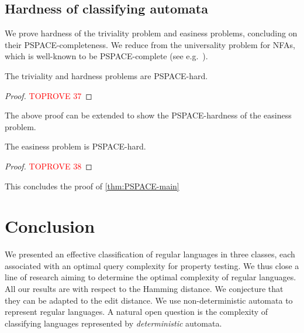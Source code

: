 \documentclass[letterpaper, USenglish, cleveref, autoref, thm-restate, numberwithinsect]{lipics-v2021}
\theoremstyle{theorem}
\theoremstyle{definition}
\newcommand{\PSPACE}{\textsf{PSPACE}\xspace}
\begin{document}
\subsection{Hardness of classifying automata}\label{sec:pspace-hard}

We prove hardness of the triviality problem and easiness problems, concluding on their \PSPACE-completeness.
We reduce from the universality problem for NFAs, which is well-known to be \PSPACE-complete (see e.g.~\cite[Theorem 10.14]{aho1974design}).

\begin{lemma}\label{lemma:trivial-complexity}
	The triviality and hardness problems are \PSPACE-hard.
\end{lemma}
\begin{proof}\textcolor{red}{TOPROVE 37}\end{proof}

The above proof can be extended to show the \PSPACE-hardness of the easiness problem.
\begin{corollary}\label{cor:hardness-easy}
	The easiness problem is \PSPACE-hard.
\end{corollary}
\begin{proof}\textcolor{red}{TOPROVE 38}\end{proof}

This concludes the proof of \cref{thm:PSPACE-main} 



\section{Conclusion}
We presented an effective classification of regular languages in three classes, each associated with an optimal query complexity for property testing.
We thus close a line of research aiming to determine the optimal complexity of regular languages.
All our results are with respect to the Hamming distance. We conjecture that they can be adapted to the edit distance.
We use non-deterministic automata to represent regular languages. 
A natural open question is the complexity of classifying languages represented by \emph{deterministic} automata.




\newpage
\end{document}
